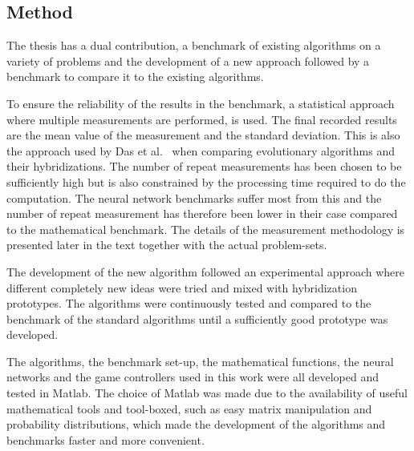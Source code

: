\subsection{Method}

The thesis has a dual contribution, a benchmark of existing algorithms on a variety of problems and the development of a new approach followed by a benchmark to compare it to the existing algorithms.

To ensure the reliability of the results in the benchmark, a statistical approach where multiple measurements are performed, is used. The final recorded results are the mean value of the measurement and the standard deviation. This is also the approach used by Das et al.~\cite{Das2008} when comparing evolutionary algorithms and their hybridizations. The number of repeat measurements has been chosen to be sufficiently high but is also constrained by the processing time required to do the computation. The neural network benchmarks suffer most from this and the number of repeat measurement has therefore been lower in their case compared to the mathematical benchmark. The details of the measurement methodology is presented later in the text together with the actual problem-sets.

The development of the new algorithm followed an experimental approach where different completely new ideas were tried and mixed with hybridization prototypes. The algorithms were continuously tested and compared to the benchmark of the standard algorithms until a sufficiently good prototype was developed.

The algorithms, the benchmark set-up, the mathematical functions, the neural networks and the game controllers used in this work were all developed and tested in Matlab. The choice of Matlab was made due to the availability of useful mathematical tools and tool-boxed, such as easy matrix manipulation and probability distributions, which made the development of the algorithms and benchmarks faster and more convenient.
